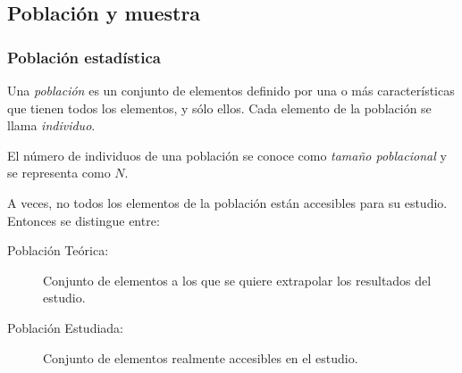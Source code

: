 \subsection{Población y muestra}
\begin{frame}
\frametitle{Población estadística}
\begin{definicion}[Población]
Una \emph{población} es un conjunto de elementos definido por una o más características que tienen todos los elementos, y sólo ellos.
Cada elemento de la población se llama \emph{individuo}.
\end{definicion}
\begin{definicion}
El número de individuos de una población se conoce como \emph{tamaño poblacional} y se representa como $N$.
\end{definicion}
A veces, no todos los elementos de la población están accesibles para su estudio. Entonces se distingue entre:
\begin{description}
\item [Población Teórica:] Conjunto de elementos a los que se quiere extrapolar los resultados del estudio.
\item [Población Estudiada:] Conjunto de elementos realmente accesibles en el estudio.
\end{description}
\end{frame}
